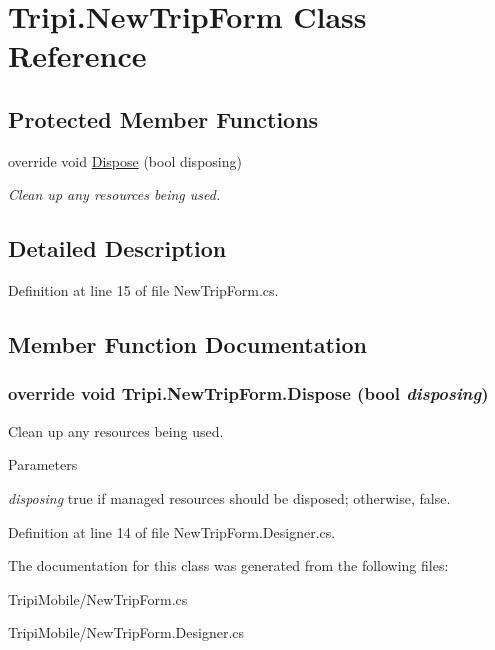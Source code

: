 \hypertarget{class_tripi_1_1_new_trip_form}{
\section{Tripi.NewTripForm Class Reference}
\label{class_tripi_1_1_new_trip_form}
}
\subsection*{Protected Member Functions}
\begin{DoxyCompactItemize}
\item 
override void \hyperlink{class_tripi_1_1_new_trip_form_a7bb087e0a05c070796b1183b515c3ab8}{Dispose} (bool disposing)
\begin{DoxyCompactList}\small\item\em Clean up any resources being used. \item\end{DoxyCompactList}\end{DoxyCompactItemize}


\subsection{Detailed Description}


Definition at line 15 of file NewTripForm.cs.

\subsection{Member Function Documentation}
\hypertarget{class_tripi_1_1_new_trip_form_a7bb087e0a05c070796b1183b515c3ab8}{
\subsubsection[{Dispose}]{\setlength{\rightskip}{0pt plus 5cm}override void Tripi.NewTripForm.Dispose (bool {\em disposing})}}
\label{class_tripi_1_1_new_trip_form_a7bb087e0a05c070796b1183b515c3ab8}


Clean up any resources being used. 
\begin{DoxyParams}{Parameters}
\item[{\em disposing}]true if managed resources should be disposed; otherwise, false.\end{DoxyParams}


Definition at line 14 of file NewTripForm.Designer.cs.

The documentation for this class was generated from the following files:\begin{DoxyCompactItemize}
\item 
TripiMobile/NewTripForm.cs\item 
TripiMobile/NewTripForm.Designer.cs\end{DoxyCompactItemize}
